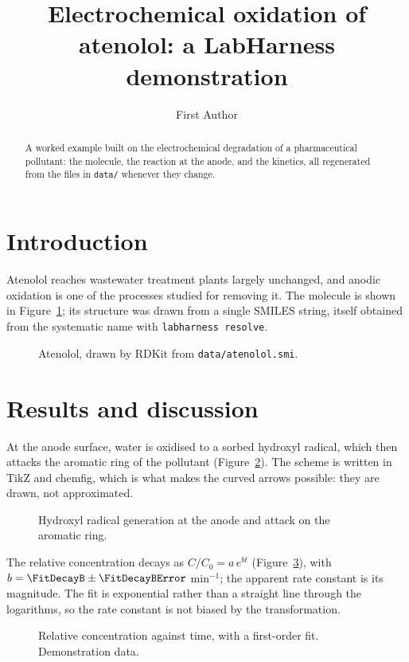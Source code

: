 \documentclass[journal=jacsat,manuscript=article]{achemso}
\title{Electrochemical oxidation of atenolol: a LabHarness demonstration}
\author{First Author}
\affiliation{Department, University, City, Country}
\begin{document}
\begin{abstract}
  A worked example built on the electrochemical degradation of a pharmaceutical pollutant: the
  molecule, the reaction at the anode, and the kinetics, all regenerated from the files in
  \texttt{data/} whenever they change.
\end{abstract}

\section{Introduction}

Atenolol reaches wastewater treatment plants largely unchanged, and anodic oxidation is one of
the processes studied for removing it.\cite{moragomez2020} The molecule is shown in
Figure~\ref{fig:atenolol}; its structure was drawn from a single SMILES string, itself obtained
from the systematic name with \texttt{labharness resolve}.

\begin{figure}
  \centering
  \caption{Atenolol, drawn by RDKit from \texttt{data/atenolol.smi}.}
  \label{fig:atenolol}
\end{figure}

\section{Results and discussion}

At the anode surface, water is oxidised to a sorbed hydroxyl radical, which then attacks the
aromatic ring of the pollutant (Figure~\ref{fig:mechanism}). The scheme is written in TikZ and
chemfig, which is what makes the curved arrows possible: they are drawn, not approximated.

\begin{figure}
  \centering
  \caption{Hydroxyl radical generation at the anode and attack on the aromatic ring.}
  \label{fig:mechanism}
\end{figure}

The relative concentration decays as $C/C_0 = a\,e^{bt}$ (Figure~\ref{fig:decay}), with
$b = \FitDecayB \pm \FitDecayBError$ min$^{-1}$; the apparent rate constant is its magnitude.
The fit is exponential rather than a straight line through
the logarithms, so the rate constant is not biased by the transformation.

\begin{figure}
  \centering
  \caption{Relative concentration against time, with a first-order fit. Demonstration data.}
  \label{fig:decay}
\end{figure}
\end{document}
